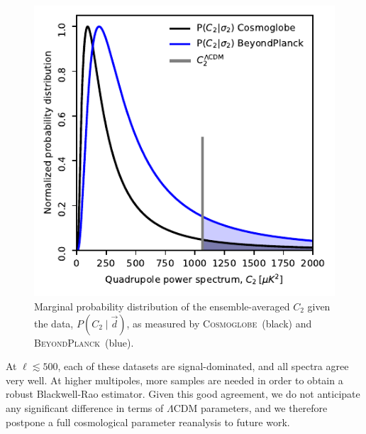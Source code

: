\documentclass[twocolumn]{../../common/aa}
\def\LCDM{$\Lambda$CDM}
\newcommand{\BP}{\textsc{BeyondPlanck}}
\newcommand{\bp}{\textsc{BeyondPlanck}}
\newcommand{\cosmoglobe}{\textsc{Cosmoglobe}}
\newcommand{\Cosmoglobe}{\textsc{Cosmoglobe}}
\newcommand{\data}{\vec d}
\begin{document}
\begin{figure}[t]
	\includegraphics[width=\columnwidth]{figures/WMAP_blackwell-rao.pdf}
	\caption{Marginal probability distribution of the ensemble-averaged $C_2$ given the data, $P(C_2\mid\data)$, as measured by \Cosmoglobe\ (black) and \BP\ (blue).}
	\label{fig:blackwell_rao_sigma_2}
\end{figure}


At $\ell\lesssim500$, each of these datasets are signal-dominated, and all spectra agree very well. At higher multipoles, more samples are needed in order to obtain a robust Blackwell-Rao estimator. %
Given this good agreement, we do not anticipate any significant difference in terms of $\Lambda$CDM parameters, and we therefore postpone a full cosmological parameter reanalysis to future work. 
\end{document}
